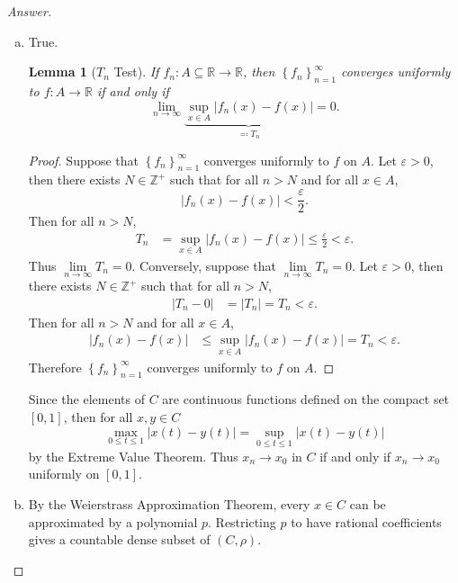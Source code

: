 \documentclass[12pt]{article}
\newcommand{\z}{\mathbb{Z}}
\newcommand{\real}{\mathbb{R}}
\newcommand\setb[1]{\left \{ #1 \right \}}
\newcommand{\eps}{\varepsilon}
\newtheorem{lemma}[theorem]{Lemma}
\theoremstyle{definition}
\begin{document}
\begin{proof}[Answer]
    \noindent
    \begin{enumerate}[(a)]
        \item True. 
        \begin{lemma}[$T_n$ Test]
            If $f_n : A \subseteq \real \to \real$, then $\setb{ f_n }_{n=1}^{\infty}$ converges uniformly to $f : A \to \real$ if and only if 
            \[
                \lim\limits_{n \to \infty} \underbrace{ \sup\limits_{x \in A} \left| f_n(x) - f(x) \right| }_{ \eqqcolon T_n } = 0.
            \]
        \end{lemma}
        \begin{proof}
            Suppose that $\setb{ f_n }_{n=1}^{\infty}$ converges uniformly to $f$ on $A$. Let $\eps > 0$, then there exists $N \in \z^+$ such that for all $n > N$ and for all $x \in A$,
            \[
                \left| f_n(x) - f(x) \right| < \frac{\eps}{2}.
            \]
            Then for all $n > N$,
            \begin{align*}
                T_n & = \sup\limits_{x \in A} \left| f_n(x) - f(x) \right| \leq \frac{\eps}{2} < \eps.
            \end{align*}
            Thus $\lim\limits_{n \to \infty} T_n = 0$. Conversely, suppose that $\lim\limits_{n \to \infty} T_n = 0$. Let $\eps > 0$, then there exists $N \in \z^+$ such that for all $n > N$, 
            \begin{align*}
                \left| T_n - 0 \right| & = \left| T_n \right| = T_n < \eps.
            \end{align*}
            Then for all $n > N$ and for all $x \in A$, 
            \begin{align*}
                \left| f_n(x) - f(x) \right| & \leq \sup\limits_{x \in A} \left| f_n(x) - f(x) \right| = T_n < \eps.
            \end{align*}
            Therefore $\setb{ f_n }_{n=1}^{\infty}$ converges uniformly to $f$ on $A$.
        \end{proof}
        Since the elements of $C$ are continuous functions defined on the compact set $[0,1]$, then for all $x, y \in C$
        \[
            \max\limits_{0 \leq t \leq 1} |x(t) - y(t)| = \sup\limits_{0 \leq t \leq 1} |x(t) - y(t)|
        \]
        by the Extreme Value Theorem. Thus $x_n \to x_0$ in $C$ if and only if $x_n \to x_0$ uniformly on $[0,1]$.
        \item By the Weierstrass Approximation Theorem, every $x \in C$ can be approximated by a polynomial $p$. Restricting $p$ to have rational coefficients gives a countable dense subset of $(C,\rho)$.

\end{enumerate}
\end{proof}
\end{document}
